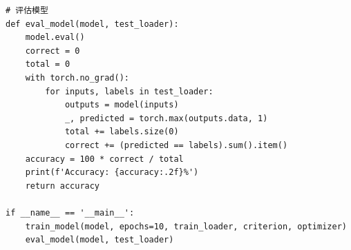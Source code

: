 \begin{answer}
\begin{verbatim}
# 评估模型
def eval_model(model, test_loader):
    model.eval()
    correct = 0
    total = 0
    with torch.no_grad():
        for inputs, labels in test_loader:
            outputs = model(inputs)
            _, predicted = torch.max(outputs.data, 1)
            total += labels.size(0)
            correct += (predicted == labels).sum().item()
    accuracy = 100 * correct / total
    print(f'Accuracy: {accuracy:.2f}%')
    return accuracy

if __name__ == '__main__':
    train_model(model, epochs=10, train_loader, criterion, optimizer)
    eval_model(model, test_loader)
\end{verbatim}



\end{answer}
